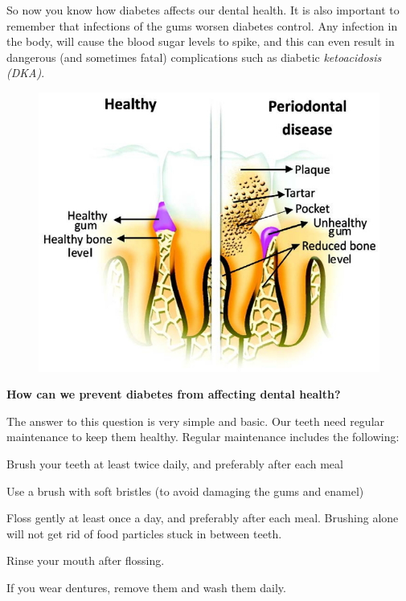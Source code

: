 {So now you know how diabetes affects our dental health. It is also important to remember that infections of the gums worsen diabetes control. Any infection in the body, will cause the blood sugar levels to spike, and this can even result in dangerous (and sometimes fatal) complications such as diabetic \textit{ketoacidosis (DKA)}.

\begin{figure}
\includegraphics{images/073.jpg}
\end{figure}

\textbf{How can we prevent diabetes from affecting dental health?}

The answer to this question is very simple and basic. Our teeth need regular maintenance to keep them healthy. Regular maintenance includes the following:

\item Brush your teeth at least twice daily, and preferably after each meal

 \item Use a brush with soft bristles (to avoid damaging the gums and enamel)

 \item Floss gently at least once a day, and preferably after each meal. Brushing alone will not get rid of food particles stuck in between teeth.

 \item Rinse your mouth after flossing.

 \item If you wear dentures, remove them and wash them daily.

}
